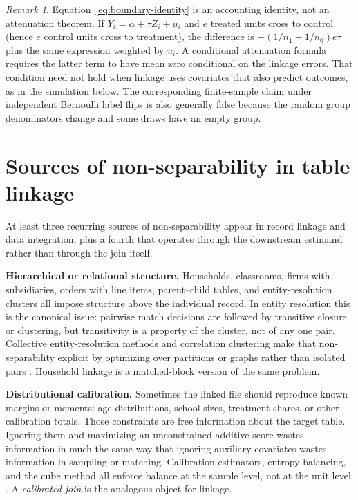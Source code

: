 \documentclass[11pt]{article}
\theoremstyle{remark}
\newtheorem*{remark}{Remark}
\begin{document}
\begin{remark}
Equation~\eqref{eq:boundary-identity} is an accounting identity, not an attenuation theorem. If $Y_i=\alpha+\tau Z_i+u_i$ and $e$ treated units cross to control (hence $e$ control units cross to treatment), the difference is $-(1/n_1+1/n_0)e\tau$ plus the same expression weighted by $u_i$. A conditional attenuation formula requires the latter term to have mean zero conditional on the linkage errors. That condition need not hold when linkage uses covariates that also predict outcomes, as in the simulation below. The corresponding finite-sample claim under independent Bernoulli label flips is also generally false because the random group denominators change and some draws have an empty group.
\end{remark}

\section{Sources of non-separability in table linkage}
\label{sec:taxonomy}

At least three recurring sources of non-separability appear in record linkage and data integration, plus a fourth that operates through the downstream estimand rather than through the join itself.

\textbf{Hierarchical or relational structure.} Households, classrooms, firms with subsidiaries, orders with line items, parent--child tables, and entity-resolution clusters all impose structure above the individual record. In entity resolution this is the canonical issue: pairwise match decisions are followed by transitive closure or clustering, but transitivity is a property of the cluster, not of any one pair. Collective entity-resolution methods and correlation clustering make that non-separability explicit by optimizing over partitions or graphs rather than isolated pairs \citep{Christen2012,BansalBlumChawla2004}. Household linkage is a matched-block version of the same problem.

\textbf{Distributional calibration.} Sometimes the linked file should reproduce known margins or moments: age distributions, school sizes, treatment shares, or other calibration totals. Those constraints are free information about the target table. Ignoring them and maximizing an unconstrained additive score wastes information in much the same way that ignoring auxiliary covariates wastes information in sampling or matching. Calibration estimators, entropy balancing, and the cube method all enforce balance at the sample level, not at the unit level \citep{DevilleSarndal1992,Hainmueller2012,DevilleTille2004}. A \emph{calibrated join} is the analogous object for linkage.
\end{document}
